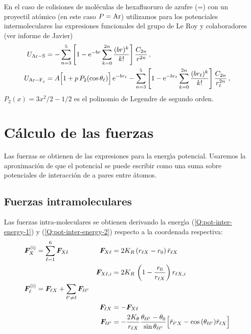 En el caso de colisiones de mol\'{e}culas de hexafluoruro de azufre (=) con un proyectil at\'{o}mico (en este caso $P=\ce{Ar}$) utilizamos para los potenciales intermoleculares las expresiones funcionales del grupo de Le Roy \autocite{Eichena1988TJCPp2898} y colaboradores (ver informe de Javier)
\begin{subequations}
  \begin{align} \label{Q:pot-inter-energy-1}
    U_{\ce{Ar-S}} &= - \sum_{n=3}^{5} \left[ 1 - \rme^{-br} \sum_{k=0}^{2n}\frac{(br)^{k}}{k!}\right] \frac{C_{2n}}{r^{2n}} \,,    \\
 \label{Q:pot-inter-energy-2}   U_{\ce{Ar-F_{\ell}}} &= A \Big[1 + p\, P_{2}(\cos \theta_{\ell})\Big]\, \rme^{-b r_{\ell}} - \sum_{n=3}^{5} \left[ 1 - \rme^{-br_{\ell}} \sum_{k=0}^{2n}\frac{(br_{\ell})^{k}}{k!}\right] \frac{C_{2n}}{r_{\ell}^{2n}}\,,
  \end{align}
\end{subequations}
$P_{2}(x)= 3 x^{2}/2 -1/2$ es el polinomio de Legendre de segundo orden.


\section{C\'{a}lculo de las fuerzas}
\label{S:calculo-fuerzas}
Las fuerzas se obtienen de las expresiones para la energ\'{\i}a potencial. Usaremos la aproximaci\'{o}n de que el potencial se puede escribir como una suma sobre potenciales de interacci\'{o}n de a pares entre \'{a}tomos. 

\subsection{Fuerzas intramoleculares}
Las fuerzas intra-moleculares se obtienen derivando la energ\'{\i}a (\ref{Q:pot-inter-energy-1}) y (\ref{Q:pot-inter-energy-2}) respecto a la coordenada respectiva:
%
\begin{subequations}
  \begin{align}\label{Q:F-sobre-X}
    &  \bm{F}^{\text{(i)}}_{X} = \sum_{\ell=1}^{6}\bm{F}_{X\ell} & \bm{F}_{X\ell} &=  2 K_{R} \, (r_{\ell X}- r_{0})\, \breve{r}_{\ell X}  \\
    & &  \bm{F}_{X\ell,i} &= 2 K_{R} \, \left( 1-\frac{r_{0}}{r_{\ell X}} \right) r_{\ell X,i}  \nonumber\\
    \label{Q:F-Sobre-Fl}
    &\bm{F}^{\text{(i)}}_{\ell} =   \bm{F}_{\ell X} + \sum_{\ell' \ne \ell} \bm{F}_{\ell \ell'} & \\
    &  & \bm{F}_{\ell X} &= -  \bm{F}_{X\ell} \nonumber \\
    & & \bm{F}_{\ell \ell'} &= -\frac{2 K_{\theta}}{r_{\ell X}} \frac{\theta_{\ell\ell'}-\theta_{0}}{\sin \theta_{\ell\ell'}} \Big[ \breve{r}_{\ell' X} - \cos{(\theta_{\ell\ell'})} \breve{r}_{\ell X} \Big] \nonumber
  \end{align}
\end{subequations}

